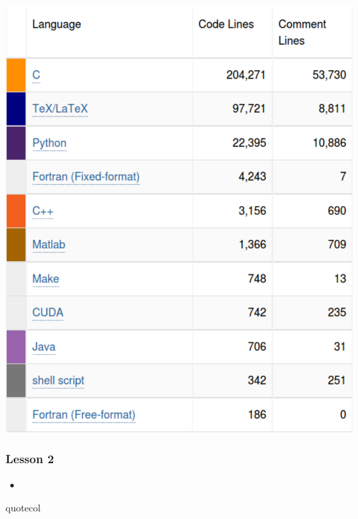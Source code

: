 \begin{frame}
\begin{minipage}{0.3\textwidth}
  \includegraphics[width=\textwidth]{Fig/ohloh2}   
\end{minipage}

\end{frame}

\begin{frame}
  \MadLogo
  \frametitle{Lesson 2}

\begin{itemize}
\item {}
\end{itemize}

\vfill
\begin{beamercolorbox}[wd=\textwidth,center]{quotecol}
\Large {}
\end{beamercolorbox}
\vfill


\end{frame}


